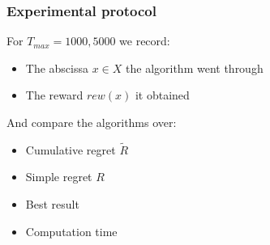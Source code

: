 \documentclass[xcolor={usenames,dvipsnames}]{beamer}
\begin{document}
\begin{frame}
\frametitle{Experimental protocol}
For $T_{max}=1000,5000$ we record:
\begin{itemize}
	\item The abscissa $x \in X$ the algorithm went through
	\item The reward $rew(x)$ it obtained
\end{itemize}
And compare the algorithms over:
\begin{itemize}
	\item Cumulative regret $\tilde{R}$
	\item Simple regret $R$
	\item Best result
	\item Computation time
\end{itemize}

\end{frame}
\end{document}
